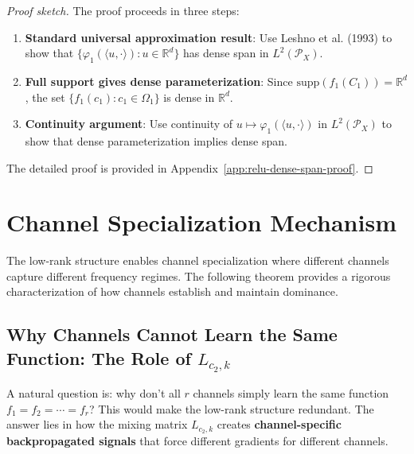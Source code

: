 \documentclass[11pt]{article}
\newcommand{\1}{\mathbbm{1}}
\begin{document}
\begin{proof}[Proof sketch]
The proof proceeds in three steps:

\begin{enumerate}
\item \textbf{Standard universal approximation result}: Use Leshno et al. (1993) to show that $\{\varphi_1(\langle u, \cdot\rangle) : u \in \mathbb{R}^d\}$ has dense span in $L^2(\mathcal{P}_X)$.

\item \textbf{Full support gives dense parameterization}: Since $\text{supp}(f_1(C_1)) = \mathbb{R}^d$, the set $\{f_1(c_1) : c_1 \in \Omega_1\}$ is dense in $\mathbb{R}^d$.

\item \textbf{Continuity argument}: Use continuity of $u \mapsto \varphi_1(\langle u, \cdot\rangle)$ in $L^2(\mathcal{P}_X)$ to show that dense parameterization implies dense span.
\end{enumerate}

The detailed proof is provided in Appendix~\ref{app:relu-dense-span-proof}.
\end{proof}

\section{Channel Specialization Mechanism}
\label{sec:channel-specialization}

The low-rank structure enables channel specialization where different channels capture different frequency regimes. The following theorem provides a rigorous characterization of how channels establish and maintain dominance.

\subsection{Why Channels Cannot Learn the Same Function: The Role of $L_{c_2,k}$}

A natural question is: why don't all $r$ channels simply learn the same function $f_1 = f_2 = \cdots = f_r$? This would make the low-rank structure redundant. The answer lies in how the mixing matrix $L_{c_2,k}$ creates \textbf{channel-specific backpropagated signals} that force different gradients for different channels.
\end{document}
